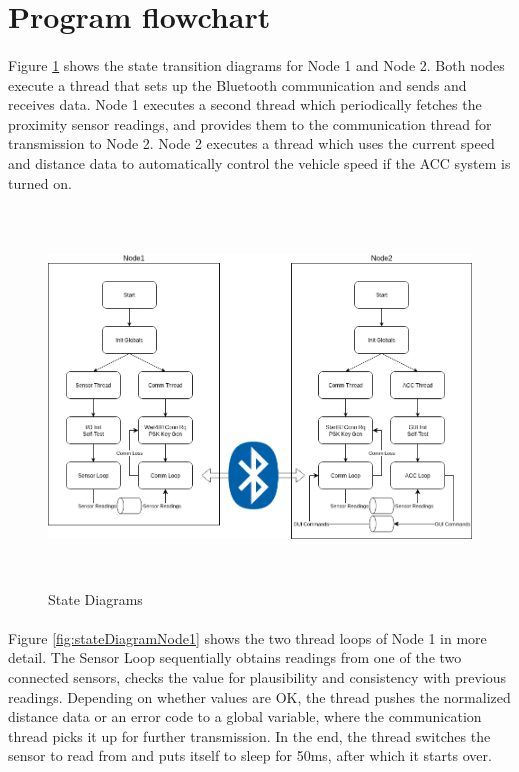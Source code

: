 \section{Program flowchart}
\label{chapter3}


\paragraph{}
Figure \ref{fig:stateDiagrams} shows the state transition diagrams for Node 1 and Node 2. Both nodes execute a thread that sets up the Bluetooth communication and sends and receives data. Node 1 executes a second thread which periodically fetches the proximity sensor readings, and provides them to the communication thread for transmission to Node 2. Node 2 executes a thread which uses the current speed and distance data to automatically control the vehicle speed if the ACC system is turned on.

\begin{figure}[h]
	\includegraphics[height=100mm]{images/StateDiagrams.png}
	\centering
	\caption{State Diagrams}
	\label{fig:stateDiagrams}
\end{figure}

\paragraph{}
Figure \ref{fig:stateDiagramNode1} shows the two thread loops of Node 1 in more detail. The Sensor Loop sequentially obtains readings from one of the two connected sensors, checks the value for plausibility and consistency with previous readings. Depending on whether values are OK, the thread pushes the normalized distance data or an error code to a global variable, where the communication thread picks it up for further transmission. In the end, the thread switches the sensor to read from and puts itself to sleep for 50ms, after which it starts over.

